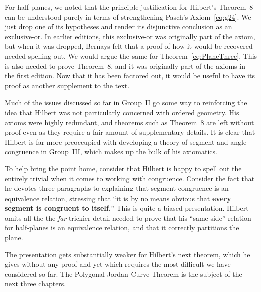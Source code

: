 For half-planes, we noted that the principle justification for Hilbert's Theorem~8 can be understood purely in terms of strengthening Pasch's Axiom~\eqref{eq:g24}. We just drop one of its hypotheses and render its disjunctive conclusion as an exclusive-or. In earlier editions, this exclusive-or was originally part of the axiom, but when it was dropped, Bernays felt that a proof of how it would be recovered needed spelling out. We would argue the same for Theorem~\ref{eq:PlaneThree}. This is also needed to prove Theorem~8, and it was originally part of the axioms in the first edition. Now that it has been factored out, it would be useful to have its proof as another supplement to the text.

Much of the issues discussed so far in Group~II go some way to reinforcing the idea that Hilbert was not particularly concerned with ordered geometry. His axioms were highly redundant, and theorems such as Theorem~8 are left without proof even as they require a fair amount of supplementary details. It is clear that Hilbert is far more preoccupied with developing a theory of segment and angle congruence in Group~III, which makes up the bulk of his axiomatics.

To help bring the point home, consider that Hilbert is happy to spell out the entirely trivial when it comes to working with congruence. Consider the fact that he devotes three paragraphs to explaining that segment congruence is an equivalence relation, stressing that ``it is by no means obvious that {\bfseries every segment is congruent to itself.}'' This is quite a biased presentation. Hilbert omits all the the \emph{far} trickier detail needed to prove that his ``same-side'' relation for half-planes is an equivalence relation, and that it correctly partitions the plane.

The presentation gets substantially weaker for Hilbert's next theorem, which he gives without any proof and yet which requires the most difficult we have considered so far. The Polygonal Jordan Curve Theorem is the subject of the next three chapters.

